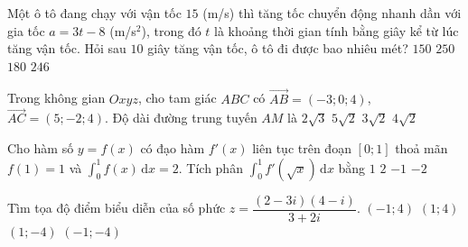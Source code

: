 \begin{ex}%
	Một ô tô đang chạy với vận tốc $15$ (m/s) thì tăng tốc chuyển động nhanh dần với gia tốc $a=3t-8$ (m/s$^{2}$), trong đó $t$ là khoảng thời gian tính bằng giây kể từ lúc tăng vận tốc. Hỏi sau $10$ giây tăng vận tốc, ô tô đi được bao nhiêu mét?
	\choice
	{$150$}
	{\True $250$}
	{$180$}
	{$246$}
\end{ex}

\begin{ex}%
	Trong không gian $Oxyz$, cho tam giác $ABC$ có $\overrightarrow{AB}=(-3; 0; 4)$, $\overrightarrow{AC}=(5;-2; 4)$. Độ dài đường trung tuyến $AM$ là
	\choice
	{$2\sqrt{3}$}
	{$5\sqrt{2}$}
	{\True $3\sqrt{2}$}
	{$4\sqrt{2}$}
\end{ex}
\begin{ex}%
	Cho hàm số $y=f(x)$ có đạo hàm $f'(x)$ liên tục trên đoạn $[0; 1]$ thoả mãn $f(1)=1$ và $\displaystyle\int_{0}^{1} f(x)\mathrm{\,d}x=2$. Tích phân $\displaystyle\int_{0}^{1} f'(\sqrt{x})\mathrm{\,d}x$ bằng
	\choice
	{$1$}
	{$2$}
	{$-1$}
	{\True $-2$}
\end{ex}

\begin{ex}%
	Tìm tọa độ điểm biểu diễn của số phức $z=\dfrac{(2-3i)(4-i)}{3+2i}$.
	\choice
	{$(-1; 4)$}
	{$(1; 4)$}
	{$(1;-4)$}
	{\True $(-1;- 4)$}
\end{ex}


